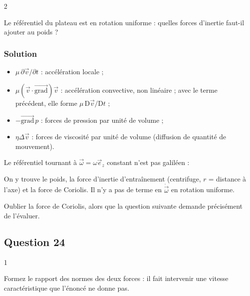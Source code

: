 \documentclass[11pt,a4paper]{article}
\providecommand{\tightlist}{\setlength{\itemsep}{0pt}\setlength{\parskip}{0pt}}
\newcommand{\equationajustee}[1]{%
  \sbox{\boiteequation}{$\displaystyle #1$}%
  \ifdim\wd\boiteequation>\linewidth
    \[\resizebox{\linewidth}{!}{\usebox{\boiteequation}}\]%
  \else
    \[#1\]%
  \fi}
\begin{document}
\begin{indication}{2}

Le référentiel du plateau est en rotation uniforme : quelles forces d'inertie faut-il ajouter au poids ?

\end{indication}

\hypertarget{solution-22}{%
\subsubsection{Solution}\label{solution-22}}

\begin{itemize}
\tightlist
\item
  \(\mu\,\partial\vec v/\partial t\) : accélération locale ;
\item
  \(\mu(\vec v\cdot\overrightarrow{\text{grad}})\vec v\) : accélération convective, non linéaire ; avec le terme précédent, elle forme \(\mu\,\mathrm D\vec v/\mathrm Dt\) ;
\item
  \(-\overrightarrow{\text{grad}}\,p\) : forces de pression par unité de volume ;
\item
  \(\eta\Delta\vec v\) : forces de viscosité par unité de volume (diffusion de quantité de mouvement).
\end{itemize}

Le référentiel tournant à \(\vec\omega=\omega\vec e_z\) constant n'est pas galiléen :

\equationajustee{\boxed{\vec f_{\text{vol}}=\mu\vec g+\mu\omega^2r\,\vec e_r-2\mu\vec\omega\wedge\vec v}}

On y trouve le poids, la force d'inertie d'entraînement (centrifuge, \(r\) = distance à l'axe) et la force de Coriolis. Il n'y a pas de terme en \(\dot{\vec\omega}\) en rotation uniforme.

\begin{piege}

Oublier la force de Coriolis, alors que la question suivante demande précisément de l'évaluer.

\end{piege}

\hypertarget{question-24}{%
\subsection{Question 24}\label{question-24}}

\begin{indication}{1}

Formez le rapport des normes des deux forces : il fait intervenir une vitesse caractéristique que l'énoncé ne donne pas.

\end{indication}
\end{document}
